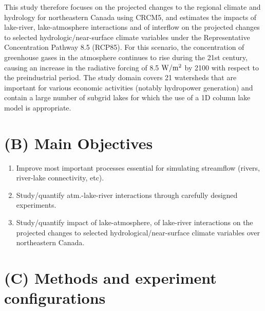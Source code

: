 \documentclass[a0,landscape]{a0poster}
\begin{document}
\begin{multicols*}{3}
This study therefore focuses on the projected changes to the regional climate
and hydrology for northeastern Canada using CRCM5, and estimates the
impacts of lake-river, lake-atmosphere interactions and of interflow on the
projected changes to selected hydrologic/near-surface climate variables under
the Representative Concentration Pathway 8.5 (RCP85). For this scenario, the
concentration of greenhouse gases in the atmosphere continues to rise during the
21st century, causing an increase in the radiative forcing of 8.5 ${\rm W/m^2}$ by 2100
with respect to the preindustrial period. The study domain covers 21
watersheds that are important for various economic activities (notably
hydropower generation) and contain a large number of subgrid lakes for which the
use of a 1D column lake model is appropriate.


\color{DarkSlateGray} %

\section*{(B) Main Objectives}
\begin{tcolorbox}[colback=white,colframe=green!40!black]
  \begin{enumerate}
  \item Improve most important processes essential for simulating streamflow (rivers, river-lake connectivity, etc).
  \item Study/quantify atm.-lake-river interactions through carefully designed experiments.
  \item Study/quantify impact of lake-atmosphere, of lake-river interactions on the projected changes to selected hydrological/near-surface climate variables over northeastern Canada.
  \end{enumerate}
\end{tcolorbox}


\section*{(C) Methods and experiment configurations}

\end{multicols*}
\end{document}
